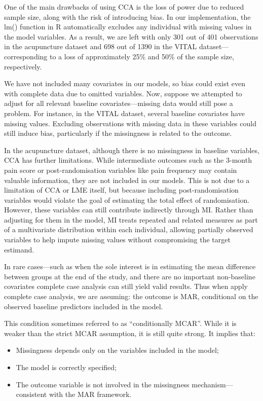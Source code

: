 \documentclass{article}
\providecommand{\tightlist}{%
  \setlength{\itemsep}{0pt}\setlength{\parskip}{0pt}}
\begin{document}
One of the main drawbacks of using CCA is the loss of power due to
reduced sample size, along with the risk of introducing bias. In our
implementation, the lm() function in R automatically excludes any
individual with missing values in the model variables. As a result, we
are left with only 301 out of 401 observations in the acupuncture
dataset and 698 out of 1390 in the VITAL dataset---corresponding to a
loss of approximately 25\% and 50\% of the sample size, respectively.

We have not included many covariates in our models, so bias could exist
even with complete data due to omitted variables. Now, suppose we
attempted to adjust for all relevant baseline covariates---missing data
would still pose a problem. For instance, in the VITAL dataset, several
baseline covariates have missing values. Excluding observations with
missing data in these variables could still induce bias, particularly if
the missingness is related to the outcome.

In the acupuncture dataset, although there is no missingness in baseline
variables, CCA has further limitations. While intermediate outcomes such
as the 3-month pain score or post-randomisation variables like pain
frequency may contain valuable information, they are not included in our
models. This is not due to a limitation of CCA or LME itself, but
because including post-randomisation variables would violate the goal of
estimating the total effect of randomisation. However, these variables
can still contribute indirectly through MI. Rather than adjusting for
them in the model, MI treats repeated and related measures as part of a
multivariate distribution within each individual, allowing partially
observed variables to help impute missing values without compromising
the target estimand.

In rare cases---such as when the sole interest is in estimating the mean
difference between groups at the end of the study, and there are no
important non-baseline covariates complete case analysis can still yield
valid results. Thus when apply complete case analysis, we are assuming:
the outcome is MAR, conditional on the observed baseline predictors
included in the model.

This condition sometimes referred to as ``conditionally MCAR''. While it
is weaker than the strict MCAR assumption, it is still quite strong. It
implies that:

\begin{itemize}
\tightlist
\item
  Missingness depends only on the variables included in the model;
\item
  The model is correctly specified;
\item
  The outcome variable is not involved in the missingness
  mechanism---consistent with the MAR framework.
\end{itemize}
\end{document}
